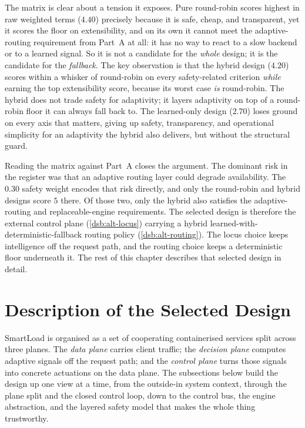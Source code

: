 The matrix is clear about a tension it exposes. Pure round-robin scores highest
in raw weighted terms ($4.40$) precisely because it is safe, cheap, and
transparent, yet it scores the floor on extensibility, and on its own it cannot
meet the adaptive-routing requirement from Part~A at all: it has no way to react
to a slow backend or to a learned signal. So it is not a candidate for the
\emph{whole} design; it is the candidate for the \emph{fallback}. The key
observation is that the hybrid design ($4.20$) scores within a whisker of
round-robin on every safety-related criterion \emph{while} earning the top
extensibility score, because its worst case \emph{is} round-robin. The hybrid
does not trade safety for adaptivity; it layers adaptivity on top of a
round-robin floor it can always fall back to. The learned-only design ($2.70$)
loses ground on every axis that matters, giving up safety, transparency, and
operational simplicity for an adaptivity the hybrid also delivers, but without
the structural guard.

Reading the matrix against Part~A closes the argument. The dominant risk in the
register was that an adaptive routing layer could degrade availability. The
$0.30$ safety weight encodes that risk directly, and only the round-robin and
hybrid designs score $5$ there. Of those two, only the hybrid also satisfies the
adaptive-routing and replaceable-engine requirements. The selected design is
therefore the external control plane (\cref{dsb:alt-locus}) carrying a hybrid
learned-with-deterministic-fallback routing policy (\cref{dsb:alt-routing}). The
locus choice keeps intelligence off the request path, and the routing choice
keeps a deterministic floor underneath it. The rest of this chapter describes
that selected design in detail.

\section{Description of the Selected Design}
\label{dsb:sec-design}

SmartLoad is organised as a set of cooperating containerised services split
across three planes. The \emph{data plane} carries client traffic; the
\emph{decision plane} computes adaptive signals off the request path; and the
\emph{control plane} turns those signals into concrete actuations on the data
plane. The subsections below build the design up one view at a time, from the
outside-in system context, through the plane split and the closed control loop,
down to the control bus, the engine abstraction, and the layered safety model
that makes the whole thing trustworthy.


